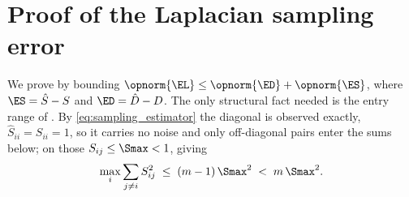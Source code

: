 \section{Proof of the Laplacian sampling error}\label{app:comp2}

We prove  by bounding
$\opnorm{\EL}\le\opnorm{\ED}+\opnorm{\ES}$, where $\ES=\hat S-S$ and
$\ED=\hat D-D$. The only structural fact needed is the entry range of
. By \eqref{eq:sampling_estimator} the diagonal is observed exactly,
$\hat S_{ii}=S_{ii}=1$, so it carries no noise and only off-diagonal pairs enter the
sums below; on those $S_{ij}\le\Smax<1$, giving
\begin{equation}\label{eq:row_norm_trivial}
   \max_i\sum_{j\ne i}S_{ij}^2\;\le\;(m-1)\,\Smax^2\;<\;m\,\Smax^2 .
\end{equation}

